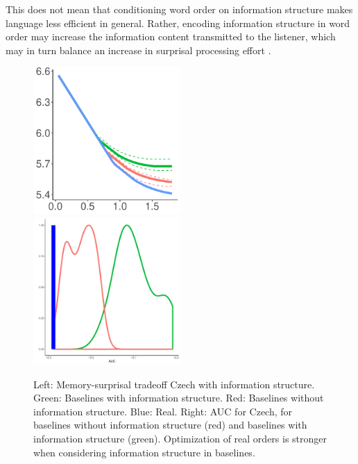 This does not mean that conditioning word order on information structure makes language less efficient in general.
Rather, encoding information structure in word order may increase the information content transmitted to the listener, which may in turn balance an increase in surprisal processing effort \citep{hahn2020optimization}.

	
\begin{figure}
\includegraphics[width=0.5\textwidth]{figures/Czech-PDT-listener-surprisal-memory-MEDIANS_onlyWordForms_boundedVocab.pdf}
\includegraphics[width=0.5\textwidth]{figures/Czech-PDT-listener-surprisal-memory-HIST_AUC_onlyWordForms_boundedVocab_REAL-infostruc.pdf}

	\caption{Left: Memory-surprisal tradeoff Czech with information structure. Green: Baselines with information structure. Red: Baselines without information structure. Blue: Real. Right: AUC for Czech, for baselines without information structure (red) and baselines with information structure (green). Optimization of real orders is stronger when considering information structure in baselines. }\label{fig:median-czech-infostruc}
\end{figure}





